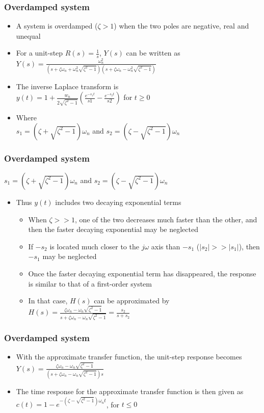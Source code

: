 \begin{frame}
\frametitle{Overdamped system}
\begin{itemize}
\item A system is overdamped ($\zeta>1$) when the two poles are negative, real and unequal
\item For a unit-step $R(s)=\frac{1}{s}$, $Y(s)$ can be written as
\ $ Y(s) = \frac{\omega_n ^2}{(s+\zeta\omega_n + \omega_n ^2\sqrt{\zeta^2 -1})(s+\zeta\omega_n - \omega_n ^2\sqrt{\zeta^2 -1})}$
\item The inverse Laplace transform is
\\ $y(t) = 1 +\frac{w_n}{2\sqrt{\zeta^2-1}}(\frac{e^{-s_1 t}}{s1} - \frac{e^{-s_2 t}}{s2})$ for $t\ge 0$
\item Where
\\ $s_1 = (\zeta +\sqrt{\zeta^2 -1})\omega_n$ and $s_2 = (\zeta -\sqrt{\zeta^2 -1})\omega_n$
\end{itemize}
\end{frame}

\begin{frame}
\frametitle{Overdamped system}
$s_1 = (\zeta +\sqrt{\zeta^2 -1})\omega_n$ and $s_2 = (\zeta -\sqrt{\zeta^2 -1})\omega_n$
\begin{itemize}
\item Thus $y(t)$ includes two decaying exponential terms
\begin{itemize}
\item When $\zeta >> 1$, one of the two decreases much faster than the other, and then the faster decaying exponential may be neglected
\item If $-s_2$ is located much closer to the $j\omega$ axis than $-s_1$ ($|s_2|>>|s_1|$), then $-s_1$ may be neglected
\item Once the faster decaying exponential term has disappeared, the response is similar to that of a first-order system
\item In that case, $H(s)$ can be approximated by
\\ $H(s) = \frac{\zeta\omega_n - \omega_n\sqrt{\zeta^2-1}}{s+\zeta\omega_n -\omega_n\sqrt{\zeta^2-1}}=\frac{s_2}{s+s_2}$
\end{itemize}
\end{itemize}
\end{frame}

\begin{frame}
\frametitle{Overdamped system}
\begin{itemize}
\item With the approximate transfer function, the unit-step response becomes
\ $Y(s) = \frac{\zeta\omega_n - \omega_n\sqrt{\zeta^2-1}}{(s+\zeta\omega_n -\omega_n\sqrt{\zeta^2-1})s}$
\item The time response for the approximate transfer function is then given as
\\ $c(t)= 1 -e^{-(\zeta-\sqrt{\zeta^2 -1})\omega_n t}$, for $t\le 0$
\end{itemize}
\end{frame}

